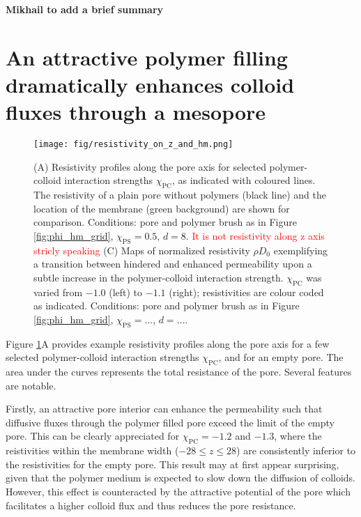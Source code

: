 \documentclass[12pt, a4paper]{article}
\newcommand\todo[1]{\textcolor{red}{#1}}
\begin{document}
% 
{\bf Mikhail to add a brief summary}
%


\section{An attractive polymer filling dramatically enhances colloid fluxes through a mesopore}

\begin{figure}
    \centering
    \texttt{[image: fig/resistivity\_on\_z\_and\_hm.png]}
    \caption{
    (A) Resistivity profiles along the pore axis for selected polymer-colloid interaction strengths $\chi_{\text{PC}}$, as indicated with coloured lines. 
    The resistivity of a plain pore without polymers (black line) and the location of the membrane (green background) are shown for comparison. 
    Conditions: pore and polymer brush as in Figure \ref{fig:phi_hm_grid}, $\chi_{\text{PS}}=0.5$, $d=8$. \todo{It is not resistivity along z axis stricly speaking}
    (C) Maps of normalized resistivity $\rho D_0$ exemplifying a transition between hindered and enhanced permeability upon a subtle increase in the polymer-colloid interaction strength.
    $\chi_{\text{PC}}$ was varied from $-1.0$ (left) to $-1.1$ (right); resistivities are colour coded as indicated. 
    Conditions: pore and polymer brush as in Figure \ref{fig:phi_hm_grid}, $\chi_{\text{PS}}=\dots$, $d=\dots$.
    }
    \label{fig:R_map}
\end{figure}

Figure \ref{fig:R_map}A provides example resistivity profiles along the pore axis for a few selected polymer-colloid interaction strengths $\chi_{\text{PC}}$, and for an empty pore. 
The area under the curves represents the total resistance of the pore.
Several features are notable. 

Firstly, an attractive pore interior can enhance the permeability such that diffusive fluxes through the polymer filled pore exceed the limit of the empty pore.
This can be clearly appreciated for $\chi_{\text{PC}}=-1.2$ and $-1.3$, 
where the reistivities within the membrane width  ($-28\le z\le 28$) are consistently inferior to the resistivities for the empty pore.
This result may at first appear surprising, given that the polymer medium is expected to slow down the diffusion of colloids.
However, this effect is counteracted by the attractive potential of the pore which facilitates a higher colloid flux and thus reduces the pore resistance.
\end{document}
